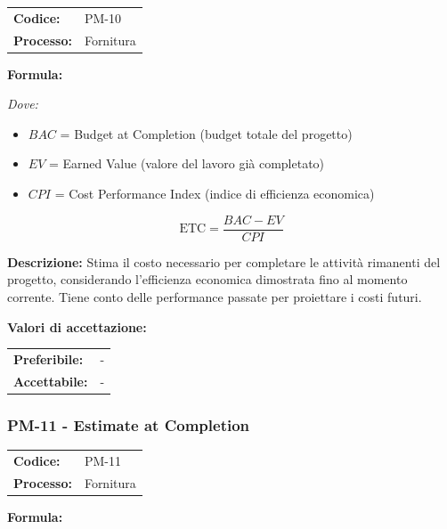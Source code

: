 \documentclass[a4paper,11pt,oneside]{scrartcl}
\begin{document}
\noindent
\begin{tabular}{@{}p{}p{}@{}}
\textbf{Codice:} & PM-10 \\
\textbf{Processo:} & Fornitura \\
\end{tabular}

\vspace{0.3cm}
\noindent\textbf{Formula:}

\noindent\textit{Dove:}
\begin{itemize}[leftmargin=1.5cm, topsep=0pt, itemsep=0pt]
    \item $BAC$ = Budget at Completion (budget totale del progetto)
    \item $EV$ = Earned Value (valore del lavoro già completato)
    \item $CPI$ = Cost Performance Index (indice di efficienza economica)
\end{itemize}

\[
\text{ETC} = \frac{BAC - EV}{CPI}
\]

\noindent\textbf{Descrizione:} Stima il costo necessario per completare le attività rimanenti del progetto, considerando l'efficienza economica dimostrata fino al momento corrente. Tiene conto delle performance passate per proiettare i costi futuri.

\vspace{0.2cm}
\noindent\textbf{Valori di accettazione:}
\vspace{0.1cm}

\noindent
\begin{tabular}{@{}ll@{}}
\textbf{Preferibile:} & - \\
\textbf{Accettabile:} & - \\
\end{tabular}

\subsubsection{PM-11 - Estimate at Completion}

\noindent
\begin{tabular}{@{}p{}p{}@{}}
\textbf{Codice:} & PM-11 \\
\textbf{Processo:} & Fornitura \\
\end{tabular}

\vspace{0.3cm}
\noindent\textbf{Formula:}
\end{document}
